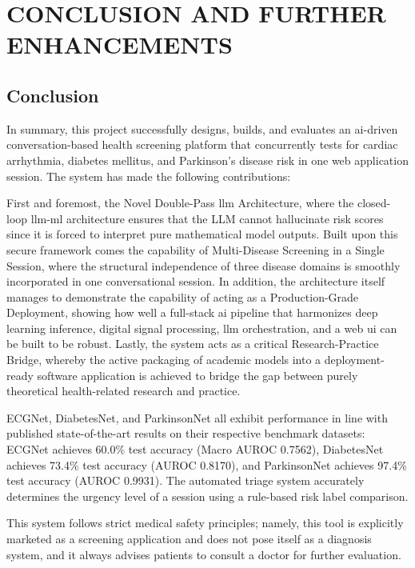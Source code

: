 \chapter{\MakeUppercase{Conclusion and Further Enhancements}}
\justifying

\section{Conclusion}

In summary, this project successfully designs, builds, and evaluates an \ac{ai}-driven conversation-based health screening platform that concurrently tests for cardiac arrhythmia, diabetes mellitus, and Parkinson's disease risk in one web application session. The system has made the following contributions:

First and foremost, the Novel Double-Pass \ac{llm} Architecture, where the closed-loop \ac{llm}-\ac{ml} architecture ensures that the LLM cannot hallucinate risk scores since it is forced to interpret pure mathematical model outputs. Built upon this secure framework comes the capability of Multi-Disease Screening in a Single Session, where the structural independence of three disease domains is smoothly incorporated in one conversational session. In addition, the architecture itself manages to demonstrate the capability of acting as a Production-Grade Deployment, showing how well a full-stack \ac{ai} pipeline that harmonizes deep learning inference, digital signal processing, \ac{llm} orchestration, and a web \ac{ui} can be built to be robust. Lastly, the system acts as a critical Research-Practice Bridge, whereby the active packaging of academic models into a deployment-ready software application is achieved to bridge the gap between purely theoretical health-related research and practice.

ECGNet, DiabetesNet, and ParkinsonNet all exhibit performance in line with published state-of-the-art results on their respective benchmark datasets: ECGNet achieves 60.0\% test accuracy (Macro AUROC 0.7562), DiabetesNet achieves 73.4\% test accuracy (AUROC 0.8170), and ParkinsonNet achieves 97.4\% test accuracy (AUROC 0.9931). The automated triage system accurately determines the urgency level of a session using a rule-based risk label comparison.

This system follows strict medical safety principles; namely, this tool is explicitly marketed as a screening application and does not pose itself as a diagnosis system, and it always advises patients to consult a doctor for further evaluation.

